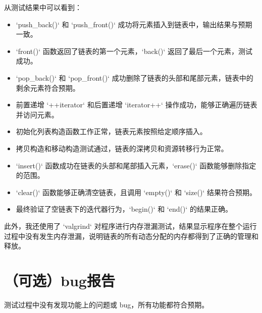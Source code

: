 \documentclass[UTF8]{ctexart}
\begin{document}
从测试结果中可以看到：
\begin{itemize}
    \item `push\_back()` 和 `push\_front()` 成功将元素插入到链表中，输出结果与预期一致。
    \item `front()` 函数返回了链表的第一个元素，`back()` 返回了最后一个元素，测试成功。
    \item `pop\_back()` 和 `pop\_front()` 成功删除了链表的头部和尾部元素，链表中的剩余元素符合预期。
    \item 前置递增 `++iterator` 和后置递增 `iterator++` 操作成功，能够正确遍历链表并访问元素。
    \item 初始化列表构造函数工作正常，链表元素按照给定顺序插入。
    \item 拷贝构造和移动构造测试通过，链表的深拷贝和资源转移行为正常。
    \item `insert()` 函数成功在链表的头部和尾部插入元素，`erase()` 函数能够删除指定的范围。
    \item `clear()` 函数能够正确清空链表，且调用 `empty()` 和 `size()` 结果符合预期。
    \item 最终验证了空链表下的迭代器行为，`begin()` 和 `end()` 的结果正确。
\end{itemize}

此外，我还使用了 `valgrind` 对程序进行内存泄漏测试，结果显示程序在整个运行过程中没有发生内存泄漏，说明链表的所有动态分配的内存都得到了正确的管理和释放。

\section{（可选）bug报告}

测试过程中没有发现功能上的问题或 bug，所有功能都符合预期。
\end{document}
